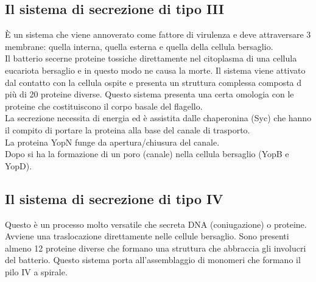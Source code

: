\subsection{Il sistema di secrezione di tipo III}
\`E un sistema che viene annoverato come fattore di virulenza e deve attraversare 3 membrane: quella interna, quella esterna e quella della cellula bersaglio.
\\Il batterio secerne proteine tossiche direttamente nel citoplasma di una cellula eucariota bersaglio e in questo modo ne causa la morte. Il sistema viene attivato dal contatto con la cellula ospite e presenta un struttura complessa composta d pi\`u di 20 proteine diverse. Questo sistema presenta una certa omologia con le proteine che costituiscono il corpo basale del flagello. 
\\La secrezione necessita di energia ed \`e assistita dalle chaperonina (Syc) che hanno il compito di portare la proteina alla base del canale di trasporto. 
\\La proteina YopN funge da apertura/chiusura del canale. 
\\Dopo si ha la formazione di un poro (canale) nella cellula bersaglio (YopB e YopD). 
\subsection{Il sistema di secrezione di tipo IV}
Questo \`e un processo molto versatile che secreta DNA (coniugazione) o proteine. 
\\Avviene una traslocazione direttamente nelle cellule bersaglio. Sono presenti almeno 12 proteine diverse che formano una struttura che abbraccia gli involucri del batterio. Questo sistema porta all'assemblaggio di monomeri che formano il pilo IV a spirale. 
